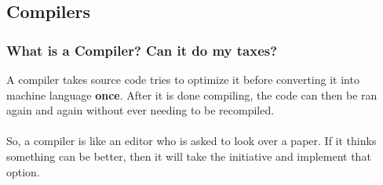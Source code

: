\documentclass{beamer}\usepackage[]{graphicx}\usepackage[]{color}
\begin{document}
\subsection{Compilers}
\begin{frame}[fragile]
\frametitle{What is a Compiler? Can it do my taxes?}

A compiler takes source code tries to optimize it before converting it into machine language \textbf{once}. After it is done compiling, the code can then be ran again and again without ever needing to be recompiled.\\$ $\\

So, a compiler is like an editor who is asked to look over a paper. If it thinks something can be better, then it will take the initiative and implement that option.\\$ $\\

\begin{center}

\end{center}

\end{frame}
\end{document}
